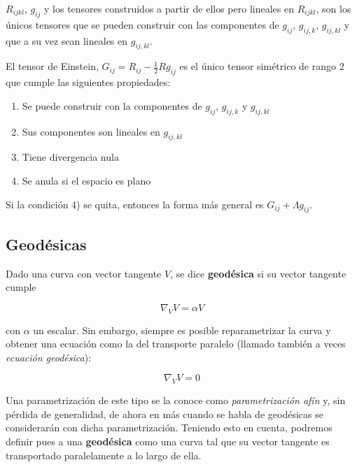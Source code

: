 \begin{lemma}
$R_{ijkl}$, $g_{ij}$ y los tensores construidos a partir de ellos pero lineales en $R_{ijkl}$, son los únicos tensores que se pueden construir con las componentes de $g_{ij}$, $g_{ij,k}$, $g_{ij,kl}$ y que a su vez sean lineales en $g_{ij,kl}$.
\end{lemma}

\begin{lemma}
El tensor de Einstein, $G_{ij}=R_{ij}-\frac{1}{2}Rg_{ij}$ es el único tensor simétrico de rango 2 que cumple las siguientes propiedades:
    \begin{enumerate}[{1)}]
    \item Se puede construir con la componentes de $g_{ij}$, $g_{ij,k}$ y $g_{ij,kl}$
    \item Sus componentes son lineales en $g_{ij,kl}$
    \item Tiene divergencia nula
    \item Se anula si el espacio es plano    
    \end{enumerate}
Si la condición 4) se quita, entonces la forma más general es $G_{ij}+\Lambda g_{ij}$.    
\end{lemma}




\subsection{Geodésicas}

Dado una curva con vector tangente $V$, se dice \textbf{geodésica} si su vector tangente cumple 

\begin{equation*}
    \nabla_VV=\alpha V
\end{equation*}

con $\alpha$ un escalar. Sin embargo, siempre es posible reparametrizar la curva y obtener una ecuación como la del transporte paralelo (llamado también a veces \textit{ecuación geodésica}):

\begin{equation*}
    \nabla_VV=0
\end{equation*}

Una parametrización de este tipo se la conoce como \textit{parametrización afín} y, sin pérdida de generalidad, de ahora en más cuando se habla de geodésicas se considerarán con dicha parametrización. Teniendo esto en cuenta, podremos definir pues a una \textbf{geodésica} como una curva tal que su vector tangente es transportado paralelamente a lo largo de ella.

